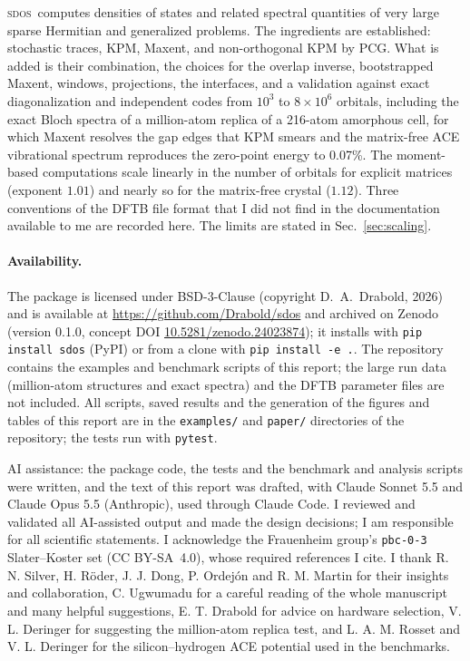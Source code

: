\documentclass[reprint,nofootinbib,superscriptaddress,amsmath,amssymb,aps,prb,floatfix]{revtex4-2}
\newcommand{\sdos}{\textsc{sdos}}
\begin{document}
\sdos\ computes densities of states and related spectral quantities of very large sparse Hermitian and generalized problems.
The ingredients are established: stochastic traces, KPM, Maxent, and non-orthogonal KPM by PCG. What is added is their combination, the choices for the overlap inverse, bootstrapped Maxent, windows, projections, the interfaces, and a validation against exact diagonalization and independent codes from $10^3$ to $8\times10^6$ orbitals, including the exact Bloch spectra of a million-atom replica of a 216-atom amorphous cell, for which Maxent resolves the gap edges that KPM smears and the matrix-free ACE vibrational spectrum reproduces the zero-point energy to 0.07\%.
The moment-based computations scale linearly in the number of orbitals for explicit matrices (exponent $1.01$) and nearly so for the matrix-free crystal ($1.12$). Three conventions of the DFTB file format that I did not find in the documentation available to me are recorded here. The limits are stated in Sec.~\ref{sec:scaling}.

\paragraph*{Availability.}
The package is licensed under BSD-3-Clause (copyright D.~A.~Drabold, 2026) and is available at \url{https://github.com/Drabold/sdos} and archived on Zenodo (version 0.1.0, concept DOI \href{https://doi.org/10.5281/zenodo.24023874}{10.5281/zenodo.24023874}); it installs with \texttt{pip install sdos} (PyPI) or from a clone with \texttt{pip install -e .}. The repository contains the examples and benchmark scripts of this report; the large run data (million-atom structures and exact spectra) and the DFTB parameter files are not included.
All scripts, saved results and the generation of the figures and tables of this report are in the \texttt{examples/} and \texttt{paper/} directories of the repository; the tests run with \texttt{pytest}.

\begin{acknowledgments}
AI assistance: the package code, the tests and the benchmark and analysis scripts were written, and the text of this report was drafted, with Claude Sonnet 5.5 and Claude Opus 5.5 (Anthropic), used through Claude Code. I reviewed and validated all AI-assisted output and made the design decisions; I am responsible for all scientific statements.
I acknowledge the Frauenheim group's \texttt{pbc-0-3} Slater--Koster set (CC BY-SA~4.0), whose required references I cite.
I thank R. N. Silver, H. R\"oder, J. J. Dong, P. Ordej\'on and R. M. Martin for their insights and collaboration, C. Ugwumadu for a careful reading of the whole manuscript and many helpful suggestions, E. T. Drabold for advice on hardware selection, V. L. Deringer for suggesting the million-atom replica test, and L. A. M. Rosset and V. L. Deringer for the silicon--hydrogen ACE potential used in the benchmarks.
\end{acknowledgments}


\end{document}

